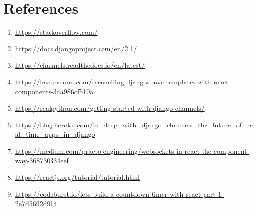 \documentclass[titlepage]{article}
\begin{document}
\section{References}
\begin{enumerate}
    \item \href{https://stackoverflow.com/}{https://stackoverflow.com/}
    \item \href{https://docs.djangoproject.com/en/2.1/}{https://docs.djangoproject.com/en/2.1/}
    \item \href{https://channels.readthedocs.io/en/latest/}{https://channels.readthedocs.io/en/latest/}
    \item \href{https://hackernoon.com/reconciling-djangos-mvc-templates-with-react-components-3aa986cf510a}{https://hackernoon.com/reconciling-djangos-mvc-templates-with-react-components-3aa986cf510a}
    \item \href{https://realpython.com/getting-started-with-django-channels/}{https://realpython.com/getting-started-with-django-channels/}
    \item \href{https://blog.heroku.com/in_deep_with_django_channels_the_future_of_real_time_apps_in_django}{https://blog.heroku.com/in\_deep\_with\_django\_channels\_the\_future\_of\_real\_time\_apps\_in\_django}
    \item \href{https://medium.com/practo-engineering/websockets-in-react-the-component-way-368730334eef}{https://medium.com/practo-engineering/websockets-in-react-the-component-way-368730334eef}
    \item \href{https://reactjs.org/tutorial/tutorial.html}{https://reactjs.org/tutorial/tutorial.html}
    \item \href{https://codeburst.io/lets-build-a-countdown-timer-with-react-part-1-2e7d5692d914}{https://codeburst.io/lets-build-a-countdown-timer-with-react-part-1-2e7d5692d914}
\end{enumerate}
\end{document}
